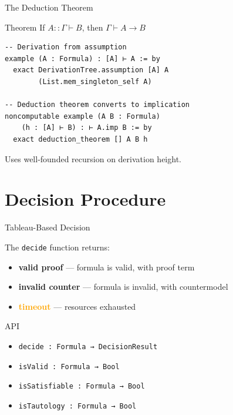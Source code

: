\documentclass[aspectratio=169,11pt]{beamer}
\newcommand{\proves}{\vdash}
\newcommand{\imp}{\rightarrow}
\begin{document}
\begin{frame}[fragile]{The Deduction Theorem}

\begin{block}{Theorem}
If $A :: \Gamma \proves B$, then $\Gamma \proves A \imp B$
\end{block}

\begin{lstlisting}
-- Derivation from assumption
example (A : Formula) : [A] ⊢ A := by
  exact DerivationTree.assumption [A] A
        (List.mem_singleton_self A)

-- Deduction theorem converts to implication
noncomputable example (A B : Formula)
    (h : [A] ⊢ B) : ⊢ A.imp B := by
  exact deduction_theorem [] A B h
\end{lstlisting}

\vspace{0.3cm}

Uses well-founded recursion on derivation height.

\end{frame}


\section{Decision Procedure}

\begin{frame}{Tableau-Based Decision}

The \texttt{decide} function returns:

\begin{itemize}
    \item \textcolor{provengreen}{\textbf{valid proof}} --- formula is valid, with proof term
    \item \textcolor{theoremred}{\textbf{invalid counter}} --- formula is invalid, with countermodel
    \item \textcolor{orange}{\textbf{timeout}} --- resources exhausted
\end{itemize}

\vspace{0.5cm}

\begin{block}{API}
\begin{itemize}
    \item \texttt{decide : Formula → DecisionResult}
    \item \texttt{isValid : Formula → Bool}
    \item \texttt{isSatisfiable : Formula → Bool}
    \item \texttt{isTautology : Formula → Bool}
\end{itemize}
\end{block}

\end{frame}
\end{document}
